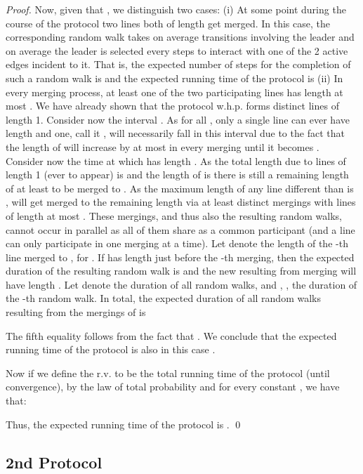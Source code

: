\documentclass[oribibl, 11pt]{llncs}
\begin{document}
\begin{proof}
Now, given that , we distinguish two cases: (i) At some point during the course of the protocol two lines both of length  get merged. In this case, the corresponding random walk takes on average  transitions involving the leader and on average the leader is selected every  steps to interact with one of the 2 active edges incident to it. That is, the expected number of steps for the completion of such a random walk is  and the expected running time of the protocol is  (ii) In every merging process, at least one of the two participating lines has length at most . We have already shown that the protocol w.h.p. forms  distinct lines of length 1. Consider now the interval . As  for all , only a single line can ever have length  and one, call it , will necessarily fall in this interval due to the fact that the length of  will increase by at most  in every merging until it becomes . Consider now the time at which  has length . As the total length due to lines of length 1 (ever to appear) is  and the length of  is  there is still a remaining length of at least  to be merged to . As the maximum length of any line different than  is ,  will get merged to the  remaining length via at least  distinct mergings with lines of length at most . These mergings, and thus also the resulting random walks, cannot occur in parallel as all of them share  as a common participant (and a line can only participate in one merging at a time). Let  denote the length of the -th line merged to , for . If  has length  just before the -th merging, then the expected duration of the resulting random walk is  and the new  resulting from merging will have length . Let  denote the duration of all random walks, and , , the duration of the -th random walk. In total, the expected duration of all random walks resulting from the  mergings of  is

The fifth equality follows from the fact that . We conclude that the expected running time of the protocol is also in this case .

Now if we define the r.v.  to be the total running time of the protocol (until convergence), by the law of total probability and for every constant , we have that:

Thus, the expected running time of the protocol is .
\qed
\end{proof}

\subsection{2nd Protocol}
\label{subsec:gline2}
\end{document}
